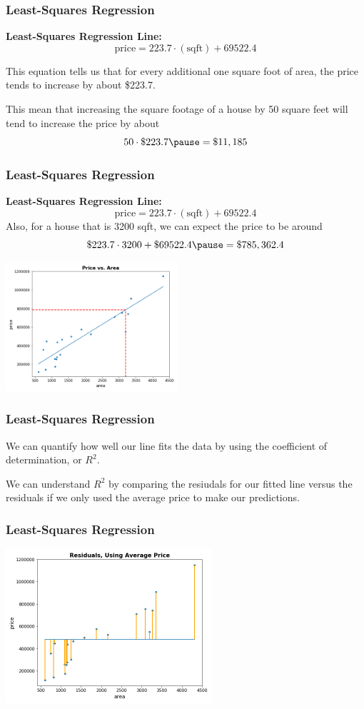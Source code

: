 \documentclass[11pt, table]{beamer}
\newcommand{\p}{\pause}
\begin{document}
\begin{frame}
\frametitle{Least-Squares Regression}
\textbf{Least-Squares Regression Line:}
$$\text{price} = 223.7\cdot(\text{sqft}) + 69522.4$$

This equation tells us that for every additional one square foot of area, the price tends to increase by about \$223.7. \p
\vspace{0.1in}

This mean that increasing the square footage of a house by 50 square feet will tend to increase the price by about\p
 $$50\cdot\$223.7\p = \$11,185$$
\end{frame}

\begin{frame}
\frametitle{Least-Squares Regression}
\textbf{Least-Squares Regression Line:}
$$\text{price} = 223.7\cdot(\text{sqft}) + 69522.4$$
Also, for a house that is 3200 sqft, we can expect the price to be around\p
$$ \$223.7\cdot 3200 + \$69522.4 \p = \$785,362.4$$\p

\begin{center}
	\includegraphics[width=2.5in]{images/Appraisal_Values/pred_01.png}
\end{center}

\end{frame}

\begin{frame}
\frametitle{Least-Squares Regression}
We can quantify how well our line fits the data by using the coefficient of determination, or $R^2$.
\vspace{0.1in}

We can understand $R^2$ by comparing the resiudals for our fitted line versus the residuals if we only used the average price to make our predictions.
\end{frame}

\begin{frame}
\frametitle{Least-Squares Regression}

\begin{center}
	\includegraphics[width=3in]{images/Appraisal_Values/r2_01.png}
\end{center}

\end{frame}
\end{document}
